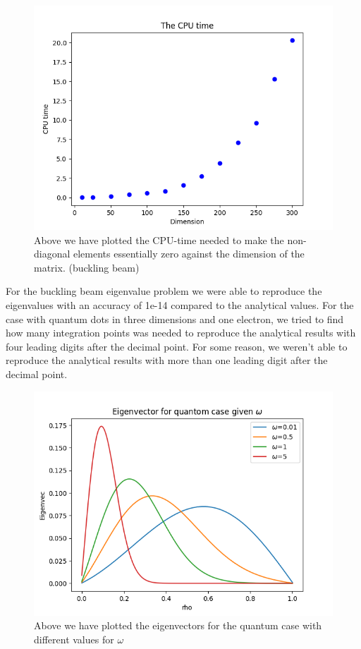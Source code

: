 \documentclass[norsk,a4paper,12pt]{article}
\begin{document}
\begin{figure}[H]
	\centering
	\includegraphics[width=\linewidth]{CPU_tid.png}
	\caption{Above we have plotted the CPU-time needed to make the non-diagonal elements essentially zero against the dimension of the matrix. (buckling beam)}
	\label{fig:CPU}
\end{figure}

For the buckling beam eigenvalue problem we were able to reproduce the eigenvalues with an accuracy of 1e-14 compared to the analytical values. For the case with quantum dots in three dimensions and one electron, we tried to find how many integration points was needed to reproduce the analytical results with four leading digits after the decimal point. For some reason, we weren't able to reproduce the analytical results with more than one leading digit after the decimal point. 

\begin{figure}[H]
	\centering
	\includegraphics[width=\linewidth]{Egenvektorer_omega.png}
	\caption{Above we have plotted the eigenvectors for the quantum case with different values for $\omega$}
	\label{fig:omega}
\end{figure}
\end{document}
